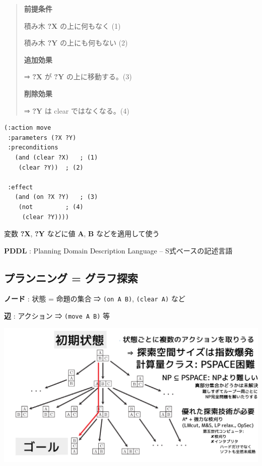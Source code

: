 \begin{container-fluid}
\begin{row-fluid}
\begin{span7}
\begin{quote}
\textbf{前提条件}

積み木 \textbf{?X} の上に何もなく (1)

積み木 \textbf{?Y} の上にも何もない (2)

\textbf{追加効果}

⇒ \textbf{?X} が \textbf{?Y} の上に移動する。(3)

\textbf{削除効果}

⇒ \textbf{?Y} は clear ではなくなる。(4)
\end{quote}
\end{span7}
\begin{span5}
\begin{verbatim}
(:action move
 :parameters (?X ?Y)
 :preconditions
   (and (clear ?X)   ; (1)
	(clear ?Y))  ; (2)

 :effect
   (and (on ?X ?Y)   ; (3)
	(not         ; (4)
	 (clear ?Y))))
\end{verbatim}
\end{span5}
\end{row-fluid}
\end{container-fluid}

変数 \textbf{?X}, \textbf{?Y} などに値 \textbf{A}, \textbf{B} などを適用して使う

\begin{note}
\textbf{PDDL} : Planning Domain Description Language -- S式ベースの記述言語
\end{note}

\subsection{プランニング = グラフ探索}
\label{sec-5-2}

\textbf{ノード} : 状態 = 命題の集合 ⇒ \texttt{(on A B)}, \texttt{(clear A)} など

\textbf{辺}     : アクション ⇒ \texttt{(move A B)} 等

\includegraphics{img/graph.png}


